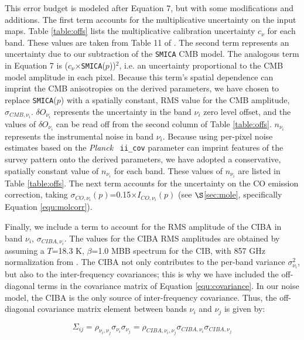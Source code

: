 \documentclass{emulateapj}
\newcommand{\PLANCK}{{\it Planck}}
\begin{document}
This error budget is modeled after \cite{planckdust} Equation 7, but with some 
modifications and additions. The first term accounts for the multiplicative 
uncertainty on the input maps. Table \ref{table:offs} lists the multiplicative 
calibration uncertainty $c_{\nu}$ for each band. These values are taken from 
Table 11 of \cite{planckcalib}. The second term represents an uncertainty due 
to our subtraction of the \verb|SMICA| CMB model. The analogous term in 
\cite{planckdust} Equation 7 is ($c_{\nu}$$\times$\verb|SMICA|($p$))$^2$, i.e. 
an uncertainty proportional to the CMB model amplitude in each pixel. Because 
this term's spatial dependence can imprint the CMB anisotropies on the derived 
parameters, we have chosen to replace \verb|SMICA|($p$) with a spatially 
constant, RMS value for the CMB amplitude, $\sigma_{CMB, \nu_i}$. 
$\delta O_{\nu_i}$ represents the uncertainty in the band $\nu_i$ zero level 
offset, and the values of $\delta O_{\nu_i}$ can be read off from the second 
column of Table \ref{table:offs}. $n_{\nu_i}$ represents the instrumental noise
in band $\nu_i$. Because using per-pixel noise estimates based on the \PLANCK~
\verb|ii_cov| parameter can imprint features of the survey pattern onto the 
derived parameters, we have adopted a conservative, spatially constant value of
$n_{\nu_i}$ for each band. These values of $n_{\nu_i}$ are listed in Table 
\ref{table:offs}. The next term accounts for the uncertainty on the CO emission
correction, taking $\sigma_{CO, \nu_i}(p)$=0.15$\times$$I_{CO, \nu_i}(p)$ (see 
$\S$\ref{sec:mole}, specifically Equation \ref{equ:molcorr}).

Finally, we include a term to account for the RMS amplitude of the CIBA in
band $\nu_i$, $\sigma_{CIBA, \nu_i}$. The values for the CIBA RMS amplitudes 
are obtained by assuming a $T$=18.3 K, $\beta$=1.0 MBB spectrum for the CIB, 
with 857 GHz normalization from \cite{ciba}. The CIBA not only contributes to 
the per-band variance $\sigma^2_{\nu_i}$, but also to the inter-frequency 
covariances; this is why we have included the off-diagonal terms in the
covariance matrix of Equation \ref{equ:covariance}. In our noise model, the 
CIBA is the only source of inter-frequency covariance. Thus, the off-diagonal 
covariance matrix element between bands $\nu_i$ and $\nu_j$ is given by:

\begin{equation}
\Sigma_{ij} = \rho_{\nu_i, \nu_j}\sigma_{\nu_i}\sigma_{\nu_j} = \rho_{CIBA, \nu_i, \nu_j}\sigma_{CIBA, \nu_i}\sigma_{CIBA, \nu_j}
\end{equation}
\end{document}
